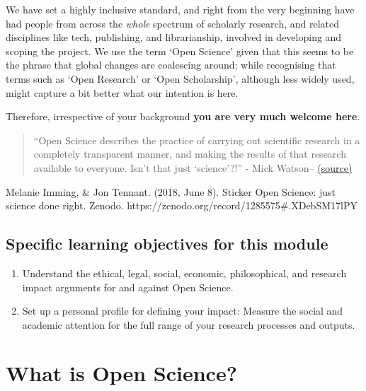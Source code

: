 \documentclass[]{book}
\begin{document}
We have set a highly inclusive standard, and right from the very beginning have had people from across the \emph{whole} spectrum of scholarly research, and related disciplines like tech, publishing, and librarianship, involved in developing and scoping the project. We use the term `Open Science' given that this seems to be the phrase that global changes are coalescing around; while recognising that terms such as `Open Research' or `Open Scholarship', although less widely used, might capture a bit better what our intention is here.

Therefore, irrespective of your background \textbf{you are very much welcome here}.

\begin{quote}
``Open Science describes the practice of carrying out scientific research in a completely transparent manner, and making the results of that research available to everyone. Isn't that just `science'?!'' - Mick Watson-- \href{https://github.com/OpenScienceMOOC/Module-1-Open-Principles/blob/master/Reading\%20Material_Open\%20Principles/Watson\%2C\%202015.pdf}{(source)}
\end{quote}

Melanie Imming, \& Jon Tennant. (2018, June 8). Sticker Open Science: just science done right. Zenodo. https://zenodo.org/record/1285575\#.XDebSM17lPY

\hypertarget{specific-learning-objectives-for-this-module}{%
\subsection{Specific learning objectives for this module }\label{specific-learning-objectives-for-this-module}}

\begin{enumerate}
\def\labelenumi{\arabic{enumi}.}
\item
  Understand the ethical, legal, social, economic, philosophical, and research impact arguments for and against Open Science.
\item
  Set up a personal profile for defining your impact: Measure the social and academic attention for the full range of your research processes and outputs.
\end{enumerate}

\hypertarget{what-is-open-science}{%
\section{What is Open Science? }\label{what-is-open-science}}
\end{document}
